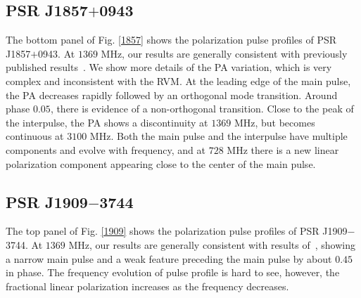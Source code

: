 \documentclass[useAMS,usenatbib]{mn2e}
\begin{document}
\begin{appendices}
\subsection{PSR J1857$+$0943}

The bottom panel of Fig. \ref{1857} shows the polarization pulse profiles of 
PSR J1857$+$0943.
%
At $1369$ MHz, our results are generally consistent with previously published 
results~\citep{Yan11}.
%
We show more details of the PA variation, which is very complex and inconsistent
with the RVM.
%
At the leading edge of the main pulse, the PA decreases rapidly followed by an 
orthogonal mode transition. 
%
Around phase $0.05$, there is evidence of a non-orthogonal transition.
%
Close to the peak of the interpulse, the PA shows a discontinuity at $1369$ MHz, 
but becomes continuous at $3100$ MHz.
%
Both the main pulse and the interpulse have multiple components and evolve 
with frequency, and at $728$ MHz there is a new linear polarization component 
appearing close to the center of the main pulse.


\subsection{PSR J1909$-$3744}

The top panel of Fig. \ref{1909} shows the polarization pulse profiles of 
PSR J1909$-$3744.
%
At $1369$ MHz, our results are generally consistent with results of~\citet{Ord04,Yan11}, 
showing a narrow main pulse and a weak feature preceding the main pulse by 
about $0.45$ in phase.
%
The frequency evolution of pulse profile is hard to see, however, the fractional 
linear polarization increases as the frequency decreases.



\end{appendices}
\end{document}
